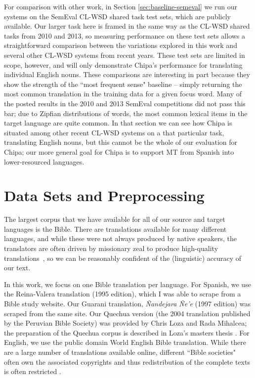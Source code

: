 For comparison with other work, in Section \ref{sec:baseline-semeval} we run
our systems on the SemEval CL-WSD shared task test sets, which are publicly
available. Our larger task here is framed in the same way as the CL-WSD shared
tasks from 2010 and 2013, so measuring performance on these test sets allows a
straightforward comparison between the variations explored in this work and
several other CL-WSD systems from recent years. These test sets are limited in
scope, however, and will only demonstrate Chipa's performance for translating
individual English nouns. These comparisons are interesting in part because
they show the strength of the ``most frequent sense" baseline -- simply
returning the most common translation in the training data for a given focus
word. Many of the posted results in the 2010 and 2013 SemEval competitions did
not pass this bar; due to Zipfian distributions of words, the most common
lexical items in the target language are quite common.
In that section we can see how Chipa is situated among other recent CL-WSD
systems on a that particular task, translating English nouns, but this cannot
be the whole of our evaluation for Chipa; our more general goal for Chipa is to
support MT from Spanish into lower-resourced languages. 

\section{Data Sets and Preprocessing}
\label{sec:datasetsandpreprocessing}
The largest corpus that we have available for all of our source and target
languages is the Bible. There are translations available for many different
languages, and while these were not always produced by native speakers, the
translators are often driven by missionary zeal to produce high-quality
translations~\cite{DBLP:journals/lre/ResnikOD99}, so we can be reasonably
confident of the (linguistic) accuracy of our text.

In this work, we focus on one Bible translation per language. For Spanish, we
use the Reina-Valera translation (1995 edition), which I was able to scrape
from a Bible study website. Our Guarani translation, \emph{Ñandejara Ñe'e}
(1997 edition) was scraped from the same site. Our Quechua version (the 2004
translation published by the Peruvian Bible Society) was provided by Chris Loza
and Rada Mihalcea; the preparation of the Quechua corpus is described in Loza's
masters thesis \cite{chrisloza}. For English, we use the public domain World
English Bible translation.
While there are a large number of translations available online, different
``Bible societies" often own the associated copyrights and thus redistribution
of the complete texts is often restricted \cite{MAYER14.220.L14-1215}.

